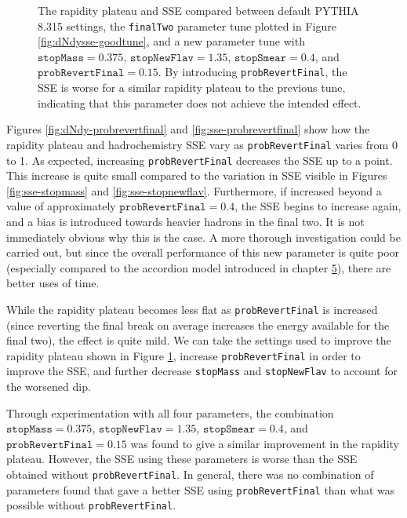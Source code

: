 \documentclass[12pt,a4paper]{report}
\begin{document}
\begin{figure}
  \centering
  
  \caption{The rapidity plateau and SSE compared between default PYTHIA 8.315 settings, the \texttt{finalTwo} parameter tune plotted in Figure \ref{fig:dNdysse-goodtune}, and a new parameter tune with $\texttt{stopMass} = 0.375$, $\texttt{stopNewFlav} = 1.35$, $\texttt{stopSmear} = 0.4$, and $\texttt{probRevertFinal} = 0.15$. By introducing \texttt{probRevertFinal}, the SSE is worse for a similar rapidity plateau to the previous tune, indicating that this parameter does not achieve the intended effect.}
  \label{fig:dNdysse-goodtunerevert}
\end{figure}

Figures \ref{fig:dNdy-probrevertfinal} and \ref{fig:sse-probrevertfinal} show how the rapidity plateau and hadrochemistry SSE vary as \texttt{probRevertFinal} varies from 0 to 1. As expected, increasing \texttt{probRevertFinal} decreases the SSE up to a point. This increase is quite small compared to the variation in SSE visible in Figures \ref{fig:sse-stopmass} and \ref{fig:sse-stopnewflav}. Furthermore, if increased beyond a value of approximately $\texttt{probRevertFinal} = 0.4$, the SSE begins to increase again, and a bias is introduced towards heavier hadrons in the final two. It is not immediately obvious why this is the case. A more thorough investigation could be carried out, but since the overall performance of this new parameter is quite poor (especially compared to the accordion model introduced in chapter \hyperref[chap:accordion]{5}), there are better uses of time.

While the rapidity plateau becomes less flat as \texttt{probRevertFinal} is increased (since reverting the final break on average increases the energy available for the final two), the effect is quite mild. We can take the settings used to improve the rapidity plateau shown in Figure \ref{fig:dNdysse-goodtunerevert}, increase \texttt{probRevertFinal} in order to improve the SSE, and further decrease \texttt{stopMass} and \texttt{stopNewFlav} to account for the worsened dip.

Through experimentation with all four parameters, the combination $\texttt{stopMass} = 0.375$, $\texttt{stopNewFlav} = 1.35$, $\texttt{stopSmear} = 0.4$, and $\texttt{probRevertFinal} = 0.15$ was found to give a similar improvement in the rapidity plateau. However, the SSE using these parameters is worse than the SSE obtained without \texttt{probRevertFinal}. In general, there was no combination of parameters found that gave a better SSE using \texttt{probRevertFinal} than what was possible without \texttt{probRevertFinal}.
\end{document}
